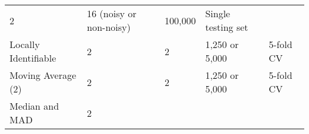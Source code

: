 \documentclass[]{article}
\begin{document}
\begin{longtable}[]{@{}lllll@{}}
\begin{minipage}[t]{0.15\columnwidth}
2\strut
\end{minipage} & \begin{minipage}[t]{0.21\columnwidth}\raggedright
16 (noisy or non-noisy)\strut
\end{minipage} & \begin{minipage}[t]{0.15\columnwidth}\raggedright
100,000\strut
\end{minipage} & \begin{minipage}[t]{0.15\columnwidth}\raggedright
Single testing set\strut
\end{minipage}\tabularnewline
\begin{minipage}[t]{0.20\columnwidth}\raggedright
Locally Identifiable\strut
\end{minipage} & \begin{minipage}[t]{0.15\columnwidth}\raggedright
2\strut
\end{minipage} & \begin{minipage}[t]{0.21\columnwidth}\raggedright
2\strut
\end{minipage} & \begin{minipage}[t]{0.15\columnwidth}\raggedright
1,250 or 5,000\strut
\end{minipage} & \begin{minipage}[t]{0.15\columnwidth}\raggedright
5-fold CV\strut
\end{minipage}\tabularnewline
\begin{minipage}[t]{0.20\columnwidth}\raggedright
Moving Average (2)\strut
\end{minipage} & \begin{minipage}[t]{0.15\columnwidth}\raggedright
2\strut
\end{minipage} & \begin{minipage}[t]{0.21\columnwidth}\raggedright
2\strut
\end{minipage} & \begin{minipage}[t]{0.15\columnwidth}\raggedright
1,250 or 5,000\strut
\end{minipage} & \begin{minipage}[t]{0.15\columnwidth}\raggedright
5-fold CV\strut
\end{minipage}\tabularnewline
\begin{minipage}[t]{0.20\columnwidth}\raggedright
Median and MAD\strut
\end{minipage} & \begin{minipage}[t]{0.15\columnwidth}\raggedright
2\strut
\end{minipage} & \begin{minipage}[t]{0.21\columnwidth}\raggedright

\end{minipage}
\end{longtable}
\end{document}

